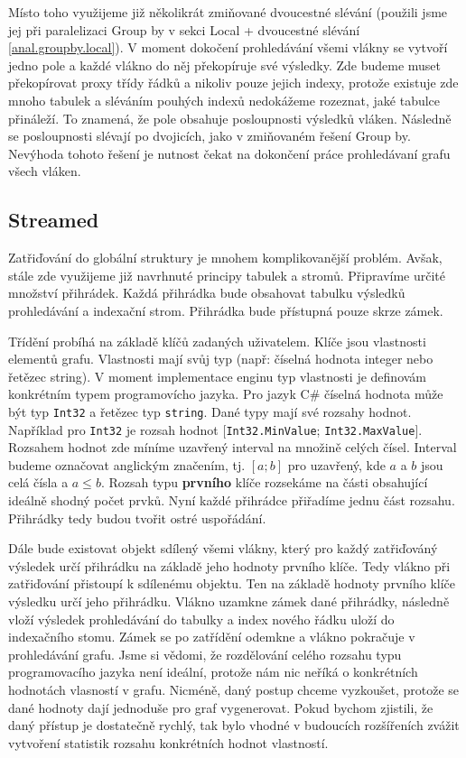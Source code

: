 Místo toho využijeme již několikrát zmiňované dvoucestné slévání (použili jsme jej při paralelizaci Group by v sekci Local + dvoucestné slévání \ref{anal.groupby.local}).
V moment dokočení prohledávání všemi vlákny se vytvoří jedno pole a každé vlákno do něj překopíruje své výsledky.
Zde budeme muset překopírovat proxy třídy řádků a nikoliv pouze jejich indexy, protože existuje zde mnoho tabulek a sléváním pouhých indexů nedokážeme rozeznat, jaké tabulce přináleží.
To znamená, že pole obsahuje posloupnosti výsledků vláken.
Následně se posloupnosti slévají po dvojicích, jako v zmiňovaném řešení Group by. 
Nevýhoda tohoto řešení je nutnost čekat na dokončení práce prohledávaní grafu všech vláken.
 
\subsection{Streamed} \label{anal.improvement.orderby.streamed}

Zatřiďování do globální struktury je mnohem komplikovanější problém.
Avšak, stále zde využijeme již navrhnuté principy tabulek a stromů.
Připravíme určité množství přihrádek.
Každá přihrádka bude obsahovat tabulku výsledků prohledávání a indexační strom.
Přihrádka bude přístupná pouze skrze zámek.

Třídění probíhá na základě klíčů zadaných uživatelem.
Klíče jsou vlastnosti elementů grafu.
Vlastnosti mají svůj typ (např: číselná hodnota integer nebo řetězec string).
V moment implementace enginu typ vlastnosti je definovám konkrétním typem programovícho jazyka.
Pro jazyk C\# číselná hodnota může být typ \texttt{Int32} a řetězec typ \texttt{string}.
Dané typy mají své rozsahy hodnot.
Například pro \texttt{Int32} je rozsah hodnot $[$\texttt{Int32.MinValue}; \texttt{Int32.MaxValue}$]$.
Rozsahem hodnot zde míníme uzavřený interval na množině celých čísel.
Interval budeme označovat anglickým značením, tj. $[a; b]$ pro uzavřený, kde $a$ a $b$ jsou celá čísla a $a\leq b$.
Rozsah typu \textbf{prvního} klíče rozsekáme na části obsahující ideálně shodný počet prvků. 
Nyní každé přihrádce přiřadíme jednu část rozsahu. 
Přihrádky tedy budou tvořit ostré uspořádání.

Dále bude existovat objekt sdílený všemi vlákny, který pro každý zatřiďováný výsledek určí přihrádku na základě jeho hodnoty prvního klíče.
Tedy vlákno při zatřiďování přistoupí k sdílenému objektu.
Ten na základě hodnoty prvního klíče výsledku určí jeho přihrádku.
Vlákno uzamkne zámek dané přihrádky, následně vloží výsledek prohledávání do tabulky a index nového řádku uloží do indexačního stomu.
Zámek se po zatřídění odemkne a vlákno pokračuje v prohledávání grafu.
Jsme si vědomi, že rozdělování celého rozsahu typu programovacího jazyka není ideální, protože nám nic neříká o konkrétních hodnotách vlasností v grafu.
Nicméně, daný postup chceme vyzkoušet, protože se dané hodnoty dají jednoduše pro graf vygenerovat.
Pokud bychom zjistili, že daný přístup je dostatečně rychlý, tak bylo vhodné v budoucích rozšířeních zvážit vytvoření statistik rozsahu konkrétních hodnot vlastností.

